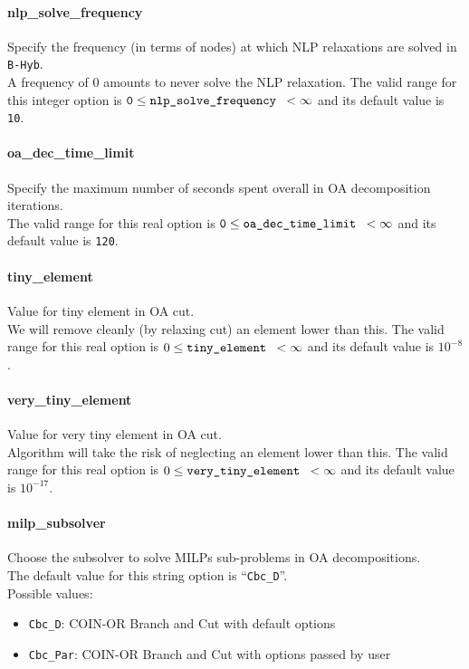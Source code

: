 \paragraph{nlp\_solve\_frequency}
Specify the frequency (in terms of nodes) at which NLP relaxations are solved in {\tt B-Hyb}. \\
 A frequency of 0 amounts to never solve the
NLP relaxation. The valid range for this integer option is
${\tt 0} \le \hbox{\tt nlp\_solve\_frequency } <  \infty$
and its default value is {\tt 10}.

\paragraph{oa\_dec\_time\_limit}
Specify the maximum number of seconds spent overall in OA decomposition iterations. \\
 The valid range for this real option is
${\tt 0} \le \hbox{\tt oa\_dec\_time\_limit } <  \infty$
and its default value is {\tt 120}.

\paragraph{tiny\_element}
Value for tiny element in OA cut. \\
We will remove cleanly (by relaxing cut) an element lower than this.
The  valid range for this real option is
$0 \le \hbox{\tt tiny\_element } <  \infty$
and its default value is $10^{-8}$.

\paragraph{very\_tiny\_element}
Value for very tiny element in OA cut. \\
Algorithm will take the risk of neglecting an element lower
than this. The  valid range for this real option is
$0 \le \hbox{\tt very\_tiny\_element } <  \infty$
and its default value is $10^{-17}$.

\paragraph{milp\_subsolver}
Choose the subsolver to solve MILPs sub-problems in OA decompositions. \\
The default value for this string option is ``{\tt Cbc\_D}''.
\\
Possible values:
\begin{itemize}
   \item {\tt Cbc\_D}: COIN-OR Branch and Cut with default options
   \item {\tt Cbc\_Par}: COIN-OR Branch and Cut with options passed by user
\end{itemize}


